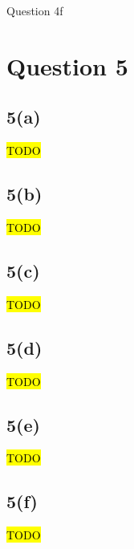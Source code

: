 \documentclass[12pt, a4paper,reqno]{article}
\begin{document}
\begin{listing}
\inputminted[linenos]{python}{question_4f.py}
\caption{Question 4f}
\end{listing}



%
%
\clearpage\section*{Question 5}

\subsection*{5(a)}
\hl{TODO}

\subsection*{5(b)}
\hl{TODO}

\subsection*{5(c)}
\hl{TODO}

\subsection*{5(d)}
\hl{TODO}

\subsection*{5(e)}
\hl{TODO}

\subsection*{5(f)}
\hl{TODO}
\end{document}
